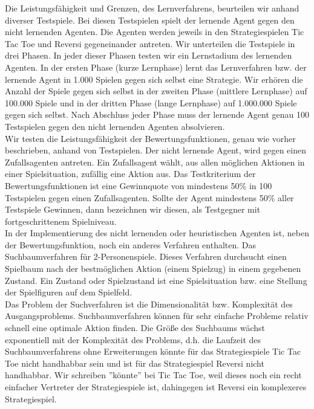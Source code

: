 Die Leistungsfähigkeit und Grenzen, des Lernverfahrens, beurteilen wir anhand diverser Testspiele. Bei diesen Testspielen spielt der lernende Agent gegen den nicht lernenden Agenten. Die Agenten werden jeweils in den Strategiespielen Tic Tac Toe und Reversi gegeneinander antreten. Wir unterteilen die Testspiele in drei Phasen. In jeder dieser Phasen testen wir ein Lernstadium des lernenden Agenten. In der ersten Phase (kurze Lernphase) lernt das Lernverfahren bzw. der lernende Agent in 1.000 Spielen gegen sich selbst eine Strategie. Wir erhören die Anzahl der Spiele gegen sich selbst in der zweiten Phase (mittlere Lernphase) auf 100.000 Spiele und in der dritten Phase (lange Lernphase) auf 1.000.000 Spiele gegen sich selbst. Nach Abschluss jeder Phase muss der lernende Agent genau 100 Testspielen gegen den nicht lernenden Agenten absolvieren. \\

Wir testen die Leistungsfähigkeit der Bewertungsfunktionen, genau wie vorher beschrieben, anhand von Testspielen. Der nicht lernende Agent, wird gegen einen Zufallsagenten antreten. Ein Zufallsagent wählt, aus allen möglichen Aktionen in einer Spielsituation, zufällig eine Aktion aus. Das Testkriterium der Bewertungsfunktionen ist eine Gewinnquote von mindestens 50\% in 100 Testspielen gegen einen Zufallsagenten. Sollte der Agent mindestens 50\% aller Testspiele Gewinnen, dann bezeichnen wir diesen, als Testgegner mit fortgeschrittenem Spielniveau. \\

In der Implementierung des nicht lernenden oder heuristischen Agenten ist, neben der Bewertungsfunktion, noch ein anderes Verfahren enthalten. Das Suchbaumverfahren für 2-Personenspiele. Dieses Verfahren durchsucht einen Spielbaum nach der bestmöglichen Aktion (einem Spielzug) in einem gegebenen Zustand. Ein Zustand oder Spielzustand ist eine Spielsituation bzw. eine Stellung der Spielfiguren auf dem Spielfeld. \\

Das Problem der Suchverfahren ist die Dimensionalität bzw. Komplexität des Ausgangsproblems. Suchbaumverfahren können für sehr einfache Probleme relativ schnell eine optimale Aktion finden. Die Größe des Suchbaums wächst exponentiell mit der Komplexität des Problems, d.h. die Laufzeit des Suchbaumverfahrens ohne Erweiterungen könnte für das Strategiespiele Tic Tac Toe nicht handhabbar sein und ist für das Strategiespiel Reversi nicht handhabbar. Wir schreiben ''könnte'' bei Tic Tac Toe, weil dieses noch ein recht einfacher Vertreter der Strategiespiele ist, dahingegen ist Reversi ein komplexeres Strategiespiel. \\

